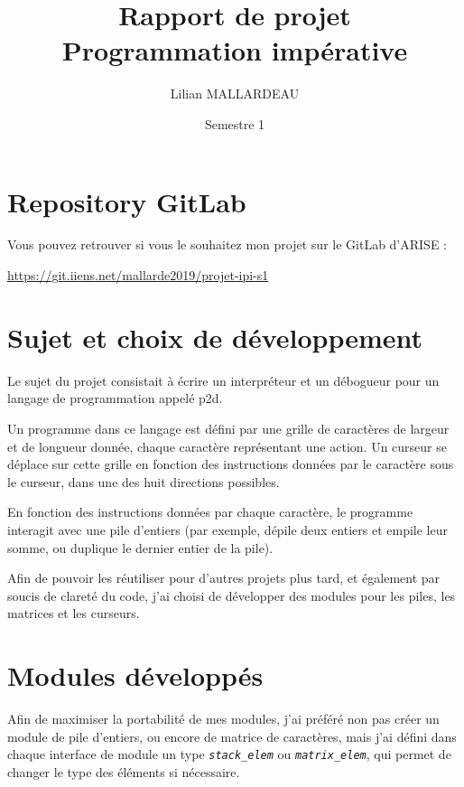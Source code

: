 \documentclass[a4paper,11pt]{article}
\title{Rapport de projet\\Programmation impérative}
\author{Lilian MALLARDEAU}
\date{Semestre 1}
\newcommand{\code}[1]{{\itshape\lstinline{#1}}}
\begin{document}
\maketitle
\tableofcontents
\break

\section*{Repository GitLab}
Vous pouvez retrouver si vous le souhaitez mon projet sur le GitLab d'ARISE :

\url{https://git.iiens.net/mallarde2019/projet-ipi-s1}

\newpage

\section*{Sujet et choix de développement}

Le sujet du projet consistait à écrire un interpréteur et un débogueur pour un langage de programmation appelé p2d.

Un programme dans ce langage est défini par une grille de caractères de largeur et de longueur donnée, chaque caractère représentant une action.
Un curseur se déplace sur cette grille en fonction des instructions données par le caractère sous le curseur, dans une des huit directions possibles.

En fonction des instructions données par chaque caractère, le programme interagit avec une pile d'entiers (par exemple, dépile deux entiers et empile leur somme, ou duplique le dernier entier de la pile).

\bigskip

Afin de pouvoir les réutiliser pour d'autres projets plus tard, et également par soucis de clareté du code, j'ai choisi de développer des modules pour les piles, les matrices et les curseurs.


\section*{Modules développés}
Afin de maximiser la portabilité de mes modules, j'ai préféré non pas créer un module de pile d'entiers, ou encore de matrice de caractères, mais j'ai défini dans chaque interface de module un type \code{stack_elem} ou \code{matrix_elem}, qui permet de changer le type des éléments si nécessaire.
\end{document}
